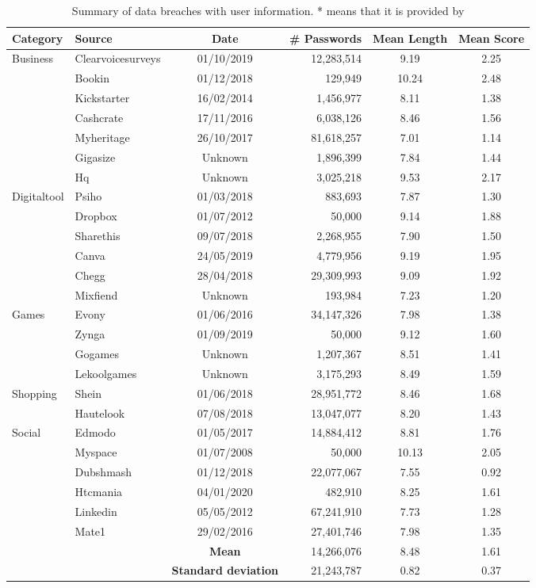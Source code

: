 \begin{table*}[h!]
\centering
\begin{tabular}{|l|l|c|r|c|c|}
\hline
\textbf{Category} & \textbf{Source} & \textbf{Date} & \textbf{\# Passwords} & \textbf{Mean Length} & \textbf{Mean Score} \\
\hline
Business&Clearvoicesurveys & 01/10/2019  & 12,283,514 & 9.19 & 2.25 \\
&Bookin & 01/12/2018  & 129,949 & 10.24 & 2.48 \\
&Kickstarter & 16/02/2014  & 1,456,977 & 8.11 & 1.38 \\
&Cashcrate & 17/11/2016  & 6,038,126 & 8.46 & 1.56 \\
&Myheritage & 26/10/2017  & 81,618,257 & 7.01 & 1.14 \\
&Gigasize & Unknown  & 1,896,399 & 7.84 & 1.44 \\
&Hq & Unknown  & 3,025,218 & 9.53 & 2.17 \\
\hline
Digitaltool&Psiho & 01/03/2018  & 883,693 & 7.87 & 1.30 \\
&Dropbox & 01/07/2012  & 50,000 & 9.14 & 1.88 \\
&Sharethis & 09/07/2018  & 2,268,955 & 7.90 & 1.50 \\
&Canva & 24/05/2019  & 4,779,956 & 9.19 & 1.95 \\
&Chegg & 28/04/2018  & 29,309,993 & 9.09 & 1.92 \\
&Mixfiend & Unknown  & 193,984 & 7.23 & 1.20 \\
\hline
Games&Evony & 01/06/2016  & 34,147,326 & 7.98 & 1.38 \\
&Zynga & 01/09/2019  & 50,000 & 9.12 & 1.60 \\
&Gogames & Unknown  & 1,207,367 & 8.51 & 1.41 \\
&Lekoolgames & Unknown  & 3,175,293 & 8.49 & 1.59 \\
\hline
Shopping&Shein & 01/06/2018  & 28,951,772 & 8.46 & 1.68 \\
&Hautelook & 07/08/2018  & 13,047,077 & 8.20 & 1.43 \\
\hline
Social&Edmodo & 01/05/2017  & 14,884,412 & 8.81 & 1.76 \\
&Myspace & 01/07/2008  & 50,000 & 10.13 & 2.05 \\
&Dubshmash & 01/12/2018  & 22,077,067 & 7.55 & 0.92 \\
&Htcmania & 04/01/2020  & 482,910 & 8.25 & 1.61 \\
&Linkedin & 05/05/2012  & 67,241,910 & 7.73 & 1.28 \\
&Mate1 & 29/02/2016  & 27,401,746 & 7.98 & 1.35 \\
\hline
\cline{3-6}
\multicolumn{2}{l|}{\multirow{2}{*}{}}& \textbf{Mean}& 14,266,076 & 8.48 & 1.61 \\
\cline{3-6}
\multicolumn{2}{l|}{}& \textbf{Standard deviation}& 21,243,787 & 0.82 & 0.37 \\
\cline{3-6}\end{tabular}
\label{table:dataleaks}\caption{Summary of data breaches with user information. \tiny{* means that it is provided by \cite{dionysiou2021honeygen}}}
\end{table*}
